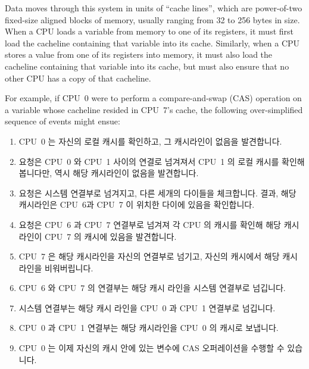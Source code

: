 Data moves through this system in units of ``cache lines'', which
are power-of-two fixed-size aligned blocks of memory, usually ranging
from 32 to 256 bytes in size.
When a CPU loads a variable from memory to one of its registers, it must
first load the cacheline containing that variable into its cache.
Similarly, when a CPU stores a value from one of its registers into
memory, it must also load the cacheline containing that variable into
its cache, but must also ensure that no other CPU has a copy of that
cacheline.

For example, if CPU~0 were to perform a compare-and-swap (CAS) operation on a
variable whose cacheline resided in CPU~7's cache, the following
over-simplified sequence of events might ensue:
\fi

\begin{enumerate}
\item	CPU~0 는 자신의 로컬 캐시를 확인하고, 그 캐시라인이 없음을 발견합니다.
\item	요청은 CPU~0 와 CPU~1 사이의 연결로 넘겨져서 CPU~1 의 로컬 캐시를
	확인해봅니다만, 역시 해당 캐시라인이 없음을 발견합니다.
\item	요청은 시스템 연결부로 넘겨지고, 다른 세개의 다이들을 체크합니다. 결과,
	해당 캐시라인은 CPU~6과 CPU~7 이 위치한 다이에 있음을 확인합니다.
\item	요청은 CPU~6 과 CPU~7 연결부로 넘겨져 각 CPU 의 캐시를 확인해 해당 캐시
	라인이 CPU~7 의 캐시에 있음을 발견합니다.
\item	CPU~7 은 해당 캐시라인을 자신의 연결부로 넘기고, 자신의 캐시에서 해당
	캐시라인을 비워버립니다.
\item	CPU~6 와 CPU~7 의 연결부는 해당 캐시 라인을 시스템 연결부로 넘깁니다.
\item	시스템 연결부는 해당 캐시 라인을 CPU~0 과 CPU~1 연결부로 넘깁니다.
\item	CPU~0 과 CPU~1 연결부는 해당 캐시라인을 CPU~0 의 캐시로 보냅니다.
\item	CPU~0 는 이제 자신의 캐시 안에 있는 변수에 CAS 오퍼레이션을 수행할 수
	있습니다.
\end{enumerate}

